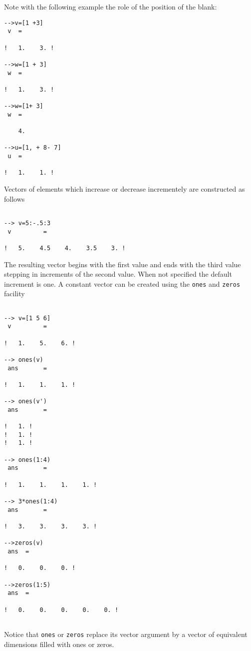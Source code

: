 Note with the following example the role of the position of the blank:
\begin{verbatim}
-->v=[1 +3]
 v  =
 
!   1.    3. !
 
-->w=[1 + 3]
 w  =
 
!   1.    3. !
 
-->w=[1+ 3] 
 w  =
 
    4. 
 
-->u=[1, + 8- 7]
 u  =
 
!   1.    1. !

\end{verbatim}

	Vectors of elements which increase
or decrease incrementely are constructed as follows 
\begin{verbatim}
 
--> v=5:-.5:3
 v         =
 
!   5.    4.5    4.    3.5    3. !
\end{verbatim}
The resulting vector begins with the first value and ends
with the third value stepping in increments of the second value.
When not specified the default increment is one.  A constant vector
can be created using the {\tt ones} and {\tt zeros} facility 
\begin{verbatim}
 
--> v=[1 5 6]
 v         =
 
!   1.    5.    6. !
 
--> ones(v)
 ans       =
 
!   1.    1.    1. !
 
--> ones(v')
 ans       =
 
!   1. !
!   1. !
!   1. !
 
--> ones(1:4)
 ans       =
 
!   1.    1.    1.    1. !
 
--> 3*ones(1:4)
 ans       =
 
!   3.    3.    3.    3. !

-->zeros(v)
 ans  =
 
!   0.    0.    0. !
 
-->zeros(1:5)
 ans  =
 
!   0.    0.    0.    0.    0. !
 
\end{verbatim}
Notice that {\tt ones} or {\tt zeros} replace its vector argument by a vector 
of equivalent dimensions filled with ones or zeros.

